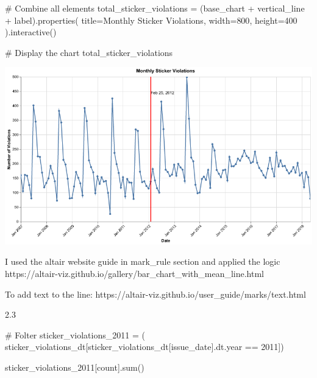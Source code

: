 \documentclass[
  letterpaper,
  DIV=11,
  numbers=noendperiod]{scrartcl}
\newenvironment{Shaded}{\begin{snugshade}}{\end{snugshade}}
\newcommand{\BuiltInTok}[1]{\textcolor[rgb]{0.00,0.23,0.31}{#1}}
\newcommand{\CommentTok}[1]{\textcolor[rgb]{0.37,0.37,0.37}{#1}}
\newcommand{\DecValTok}[1]{\textcolor[rgb]{0.68,0.00,0.00}{#1}}
\newcommand{\NormalTok}[1]{\textcolor[rgb]{0.00,0.23,0.31}{#1}}
\newcommand{\OperatorTok}[1]{\textcolor[rgb]{0.37,0.37,0.37}{#1}}
\newcommand{\StringTok}[1]{\textcolor[rgb]{0.13,0.47,0.30}{#1}}
\begin{document}
\begin{Shaded}
\begin{Highlighting}[]
\CommentTok{\# Combine all elements}
\NormalTok{total\_sticker\_violations }\OperatorTok{=}\NormalTok{ (base\_chart }\OperatorTok{+}\NormalTok{ vertical\_line }\OperatorTok{+}\NormalTok{ label).properties(}
\NormalTok{    title}\OperatorTok{=}\StringTok{\textquotesingle{}Monthly Sticker Violations\textquotesingle{}}\NormalTok{,}
\NormalTok{    width}\OperatorTok{=}\DecValTok{800}\NormalTok{,}
\NormalTok{    height}\OperatorTok{=}\DecValTok{400}
\NormalTok{).interactive()}

\CommentTok{\# Display the chart}
\NormalTok{total\_sticker\_violations}
\end{Highlighting}
\end{Shaded}

\includegraphics{ps2_final_files/figure-pdf/cell-11-output-1.png}

I used the altair website guide in mark\_rule section and applied the
logic
https://altair-viz.github.io/gallery/bar\_chart\_with\_mean\_line.html

To add text to the line:
https://altair-viz.github.io/user\_guide/marks/text.html

2.3

\begin{Shaded}
\begin{Highlighting}[]
\CommentTok{\# Folter}
\NormalTok{sticker\_violations\_2011 }\OperatorTok{=}\NormalTok{ (}
\NormalTok{    sticker\_violations\_dt[sticker\_violations\_dt[}\StringTok{\textquotesingle{}issue\_date\textquotesingle{}}\NormalTok{].dt.year }\OperatorTok{==} \DecValTok{2011}\NormalTok{])}

\NormalTok{sticker\_violations\_2011[}\StringTok{\textquotesingle{}count\textquotesingle{}}\NormalTok{].}\BuiltInTok{sum}\NormalTok{()}
\end{Highlighting}
\end{Shaded}
\end{document}
